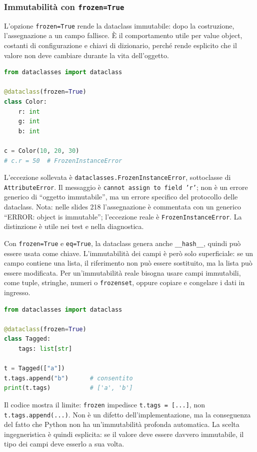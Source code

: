 \documentclass[12pt]{extarticle}
\begin{document}
\subsubsection{Immutabilità con \texttt{frozen=True}}

\noindent L'opzione \texttt{frozen=True} rende la dataclass immutabile: dopo la costruzione, l'assegnazione a un campo fallisce. È il comportamento utile per value object, costanti di configurazione e chiavi di dizionario, perché rende esplicito che il valore non deve cambiare durante la vita dell'oggetto.

\begin{lstlisting}[language=Python]
from dataclasses import dataclass

@dataclass(frozen=True)
class Color:
    r: int
    g: int
    b: int

c = Color(10, 20, 30)
# c.r = 50  # FrozenInstanceError
\end{lstlisting}

\noindent L'eccezione sollevata è \texttt{dataclasses.FrozenInstanceError}, sottoclasse di \texttt{AttributeError}. Il messaggio è \texttt{cannot assign to field 'r'}; non è un errore generico di ``oggetto immutabile'', ma un errore specifico del protocollo delle dataclass. Nota: nelle slides 218 l'assegnazione è commentata con un generico ``ERROR: object is immutable''; l'eccezione reale è \texttt{FrozenInstanceError}. La distinzione è utile nei test e nella diagnostica.

\noindent Con \texttt{frozen=True} e \texttt{eq=True}, la dataclass genera anche \texttt{\_\_hash\_\_}, quindi può essere usata come chiave. L'immutabilità dei campi è però solo superficiale: se un campo contiene una lista, il riferimento non può essere sostituito, ma la lista può essere modificata. Per un'immutabilità reale bisogna usare campi immutabili, come tuple, stringhe, numeri o \texttt{frozenset}, oppure copiare e congelare i dati in ingresso.

\begin{lstlisting}[language=Python]
from dataclasses import dataclass

@dataclass(frozen=True)
class Tagged:
    tags: list[str]

t = Tagged(["a"])
t.tags.append("b")      # consentito
print(t.tags)           # ['a', 'b']
\end{lstlisting}

\noindent Il codice mostra il limite: \texttt{frozen} impedisce \texttt{t.tags = [...]}, non \texttt{t.tags.append(...)}. Non è un difetto dell'implementazione, ma la conseguenza del fatto che Python non ha un'immutabilità profonda automatica. La scelta ingegneristica è quindi esplicita: se il valore deve essere davvero immutabile, il tipo dei campi deve esserlo a sua volta.
\end{document}
